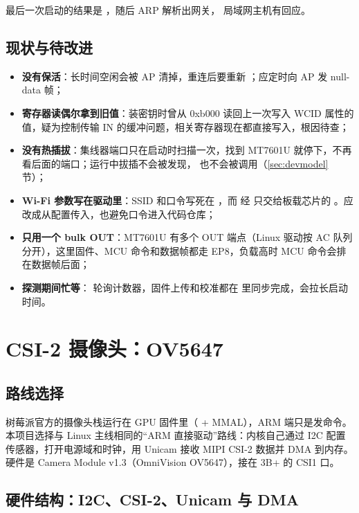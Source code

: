 最后一次启动的结果是 ，随后 ARP 解析出网关， 局域网主机有回应。

\subsection{现状与待改进}

\begin{itemize}
  \item \textbf{没有保活}：长时间空闲会被 AP 清掉，重连后要重新 ；应定时向 AP 发 null-data 帧；
  \item \textbf{寄存器读偶尔拿到旧值}：装密钥时曾从 0xb000 读回上一次写入 WCID 属性的值，疑为控制传输 IN 的缓冲问题，相关寄存器现在都直接写入，根因待查；
  \item \textbf{没有热插拔}：集线器端口只在启动时扫描一次，找到 MT7601U 就停下，不再看后面的端口；运行中拔插不会被发现， 也不会被调用（\ref{sec:devmodel} 节）；
  \item \textbf{Wi-Fi 参数写在驱动里}：SSID 和口令写死在 ，而  经  只交给板载芯片的 。应改成从配置传入，也避免口令进入代码仓库；
  \item \textbf{只用一个 bulk OUT}：MT7601U 有多个 OUT 端点（Linux 驱动按 AC 队列分开），这里固件、MCU 命令和数据帧都走 EP8，负载高时 MCU 命令会排在数据帧后面；
  \item \textbf{探测期间忙等}： 轮询计数器，固件上传和校准都在  里同步完成，会拉长启动时间。
\end{itemize}

\section{CSI-2 摄像头：OV5647}

\subsection{路线选择}

树莓派官方的摄像头栈运行在 GPU 固件里（ + MMAL），ARM 端只是发命令。本项目选择与 Linux 主线相同的“ARM 直接驱动”路线：内核自己通过 I2C 配置传感器，打开电源域和时钟，用 Unicam 接收 MIPI CSI-2 数据并 DMA 到内存。硬件是 Camera Module v1.3（OmniVision OV5647），接在 3B+ 的 CSI1 口。

\subsection{硬件结构：I2C、CSI-2、Unicam 与 DMA}
\label{sec:cam-hw}

